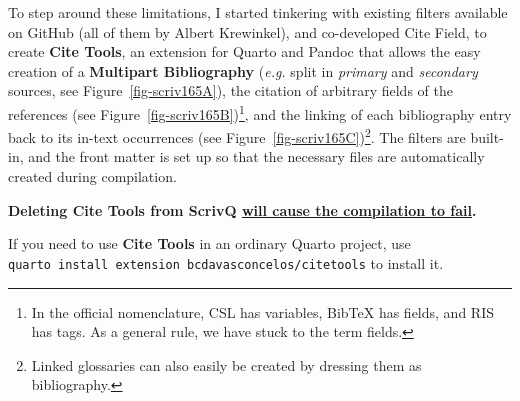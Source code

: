 \documentclass[
  12pt,
  a4paper,
  oneside,
  numbers=noenddot,
  titlepage,
  toclink=all,
  toc=bibliography]{scrbook}
\theoremstyle{definition}
\theoremstyle{definition}
\theoremstyle{definition}
\theoremstyle{plain}
\theoremstyle{plain}
\theoremstyle{plain}
\theoremstyle{plain}
\theoremstyle{plain}
\theoremstyle{remark}
\begin{document}
To step around these limitations, I started tinkering with existing
filters available on GitHub (all of them by Albert Krewinkel), and
co-developed Cite Field, to create \textbf{Cite Tools}, an extension for
Quarto and Pandoc that allows the easy creation of a \textbf{Multipart
Bibliography} (\emph{e.g.} split in \emph{primary} and \emph{secondary}
sources, see
\protect\hypertarget{cite_94}{}{\label{cite_94}Figure~\ref{fig-scriv165A}}),
the citation of arbitrary fields of the references (see
\protect\hypertarget{cite_95}{}{\label{cite_95}Figure~\ref{fig-scriv165B}})\footnote{In
  the official nomenclature, CSL has variables, BibTeX has fields, and
  RIS has tags. As a general rule, we have stuck to the term fields.},
and the linking of each bibliography entry back to its in-text
occurrences (see
\protect\hypertarget{cite_96}{}{\label{cite_96}Figure~\ref{fig-scriv165C}})\footnote{Linked
  glossaries can also easily be created by dressing them as
  bibliography.}. The filters are built-in, and the front matter is set
up so that the necessary files are automatically created during
compilation.

\begin{tcolorbox}[enhanced jigsaw, rightrule=.15mm, opacityback=0, arc=.35mm, colback=white, toprule=.15mm, breakable, bottomrule=.15mm, left=2mm, colframe=quarto-callout-warning-color-frame, leftrule=.75mm]
\begin{minipage}[t]{5.5mm}
\textcolor{quarto-callout-warning-color}{\faExclamationTriangle}
\end{minipage}%
\begin{minipage}[t]{\textwidth - 5.5mm}

\textbf{Deleting Cite Tools from ScrivQ \ul{will cause the compilation
to fail}.}\vspace{2mm}

\end{minipage}%
\end{tcolorbox}

\begin{tcolorbox}[enhanced jigsaw, rightrule=.15mm, opacityback=0, arc=.35mm, colback=white, toprule=.15mm, breakable, bottomrule=.15mm, left=2mm, colframe=quarto-callout-tip-color-frame, leftrule=.75mm]
\begin{minipage}[t]{5.5mm}
\textcolor{quarto-callout-tip-color}{\faLightbulb}
\end{minipage}%
\begin{minipage}[t]{\textwidth - 5.5mm}

If you need to use \textbf{Cite Tools }in an ordinary Quarto project,
use \texttt{quarto\ install\ extension\ bcdavasconcelos/citetools} to
install it.

\end{minipage}%
\end{tcolorbox}
\end{document}
